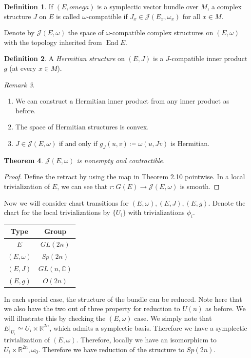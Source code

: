\documentclass[leqno, openany]{memoir}
\newtheorem{thm}{Theorem}[chapter]
\theoremstyle{definition}
\newtheorem{defn}[thm]{Definition}
\theoremstyle{remark}
\newtheorem{rmk}[thm]{Remark}
\theoremstyle{plain}
\theoremstyle{definition}
\theoremstyle{remark}
\newcommand{\R}{\mathbb{R}}
\newcommand{\C}{\mathbb{C}}
\newcommand{\mc}[1]{\mathcal{#1}}
\DeclareMathOperator{\End}{End}
\begin{document}
\begin{defn} If $(E, omega)$ is a symplectic vector bundle over $M$, a complex
structure $J$ on $E$ is called $\omega$-compatible if $J_x \in \mc{J}(E_x,
\omega_x)$ for all $x \in M$.  \end{defn} Denote by $\mc{J}(E, \omega)$ the
space of $\omega$-compatible complex structures on $(E, \omega)$ with the
topology inherited from $\End E$.  \begin{defn} A \textit{Hermitian structure}
    on $(E, J)$ is a $J$-compatible inner product $g$ (at every $x \in M$).
    \end{defn} \begin{rmk} \begin{enumerate} \item We can construct a Hermitian
    inner product from any inner product as before.  \item The space of
    Hermitian structures is convex.  \item $J \in \mc{J}(E, \omega)$ if and
    only if $g_J(u,v) \coloneqq \omega(u, Jv)$ is Hermitian.  \end{enumerate}
\end{rmk}

\begin{thm} $\mc{J}(E, \omega)$ is nonempty and contractible.  \end{thm}

\begin{proof} Define the retract by using the map in Theorem 2.10 pointwise. In
a local trivialization of $E$, we can see that $r: G(E) \to \mc{J}(E, \omega)$
is smooth.  \end{proof}

Now we will consider chart transitions for $(E, \omega), (E, J), (E, g)$.
Denote the chart for the local trivializations by $\{U_i\}$ with
trivializations $\phi_i$.  \begin{center} \begin{tabular}{cc} \toprule Type &
    Group \\ \midrule $E$ & $GL(2n)$ \\ $(E,\omega)$ & $Sp(2n)$ \\ $(E,J)$ &
$GL(n, \C)$ \\ $(E,g)$ & $O(2n)$ \\ \bottomrule \end{tabular} \end{center} In
each special case, the structure of the bundle can be reduced. Note here that
we also have the two out of three property for reduction to $U(n)$ as before.
We will illustrate this by checking the $(E, \omega)$ case. We simply note that
$E|_{U_i} \simeq U_i \times \R^{2n}$, which admits a symplectic basis.
Therefore we have a symplectic trivialization of $(E, \omega)$. Therefore,
locally we have an isomorphicm to $U_i \times \R^{2n}, \omega_0$. Therefore we
have reduction of the structure to $Sp(2n)$.
\end{document}
